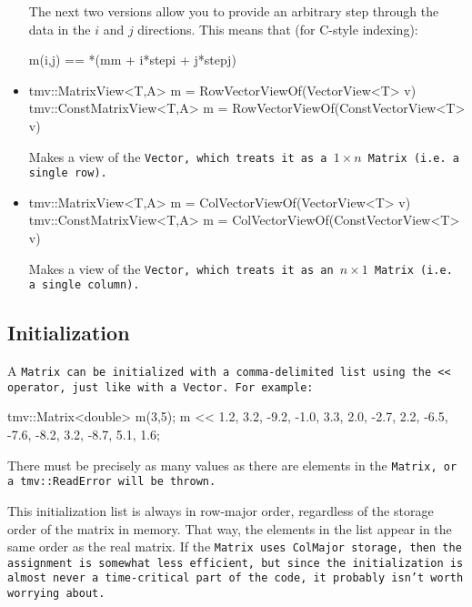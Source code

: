 \begin{itemize}
The next two versions allow you to provide an arbitrary step through
the data in the $i$ and $j$ directions.  This means that (for C-style indexing):
\begin{tmvcode}
m(i,j) == *(mm + i*stepi + j*stepj)
\end{tmvcode}

\item
\begin{tmvcode}
tmv::MatrixView<T,A> m = RowVectorViewOf(VectorView<T> v)
tmv::ConstMatrixView<T,A> m = RowVectorViewOf(ConstVectorView<T> v)
\end{tmvcode}
Makes a view of the \tt{Vector}, which treats it as a $1\times n$ \tt{Matrix}
(i.e. a single row).  

\item
\begin{tmvcode}
tmv::MatrixView<T,A> m = ColVectorViewOf(VectorView<T> v)
tmv::ConstMatrixView<T,A> m = ColVectorViewOf(ConstVectorView<T> v)
\end{tmvcode}
Makes a view of the \tt{Vector}, which treats it as an $n \times 1$ \tt{Matrix}
(i.e. a single column).  

\end{itemize}

\subsection{Initialization}
\label{Matrix_Initialization}

A \tt{Matrix} can be initialized with a comma-delimited list using
the \tt{<<} operator, just like with a \tt{Vector}.  For example:
\begin{tmvcode}
tmv::Matrix<double> m(3,5);
m << 1.2,  3.2, -9.2, -1.0,  3.3, 
     2.0, -2.7,  2.2, -6.5, -7.6, 
    -8.2,  3.2, -8.7,  5.1,  1.6;
\end{tmvcode}
There must be precisely as many values as there are elements in the \tt{Matrix},
or a \tt{tmv::ReadError} will be thrown.

This initialization list is always in row-major order, regardless of the storage order of the 
matrix in memory.  That way, the elements in the list appear in the same order as the 
real matrix.  If the \tt{Matrix} uses \tt{ColMajor} storage, then the assignment is somewhat
less efficient, but since the initialization is almost never a time-critical part of the code, 
it probably isn't worth worrying about.

